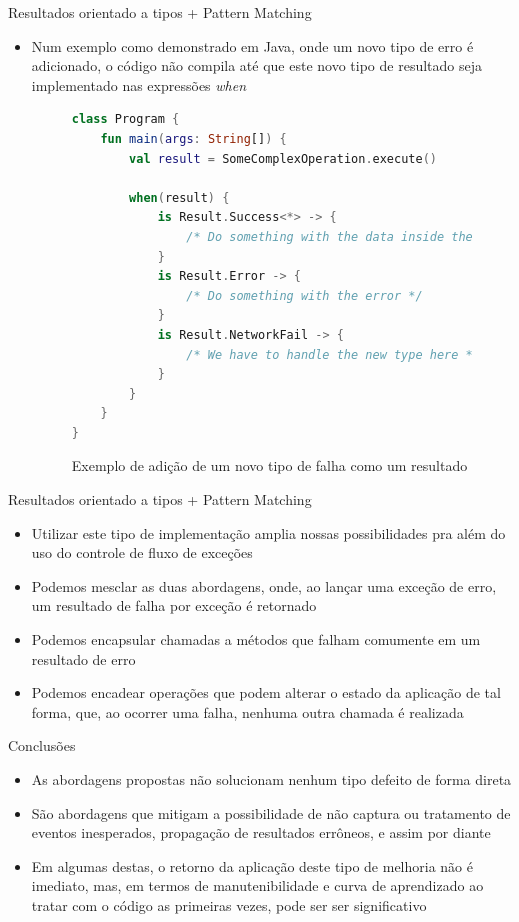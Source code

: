 \documentclass[brazilian]{beamer}
\begin{document}
\begin{frame}[fragile]{Resultados orientado a tipos + Pattern Matching}
    \begin{itemize}
        \item Num exemplo como demonstrado em Java, onde um novo tipo de erro é adicionado, o código não compila até que este novo tipo de resultado seja implementado nas expressões \emph{when}
        \begin{figure}[H]
            \centering
            \begin{lstlisting}[language=Kotlin]
class Program {
    fun main(args: String[]) {
        val result = SomeComplexOperation.execute()

        when(result) {
            is Result.Success<*> -> {
                /* Do something with the data inside the success object */
            }
            is Result.Error -> {
                /* Do something with the error */
            }
            is Result.NetworkFail -> {
                /* We have to handle the new type here */
            }
        }
    }
}
            \end{lstlisting}
            \caption{Exemplo de adição de um novo tipo de falha como um resultado}
            \label{fig:kotlin_result_class_example}
        \end{figure}
    \end{itemize}
\end{frame}

\begin{frame}{Resultados orientado a tipos + Pattern Matching}
    \begin{itemize}
        \item Utilizar este tipo de implementação amplia nossas possibilidades pra além do uso do controle de fluxo de exceções
        \item Podemos mesclar as duas abordagens, onde, ao lançar uma exceção de erro, um resultado de falha por exceção é retornado
        \item Podemos encapsular chamadas a métodos que falham comumente em um resultado de erro
        \item Podemos encadear operações que podem alterar o estado da aplicação de tal forma, que, ao ocorrer uma falha, nenhuma outra chamada é realizada
    \end{itemize}
\end{frame}

\begin{frame}{Conclusões}
    \begin{itemize}
        \item As abordagens propostas não solucionam nenhum tipo defeito de forma direta
        \item São abordagens que mitigam a possibilidade de não captura ou tratamento de eventos inesperados, propagação de resultados errôneos, e assim por diante
        \item Em algumas destas, o retorno da aplicação deste tipo de melhoria não é imediato, mas, em termos de manutenibilidade e curva de aprendizado ao tratar com o código as primeiras vezes, pode ser ser significativo
    \end{itemize}
\end{frame}
\end{document}
